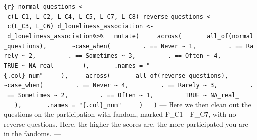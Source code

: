 \documentclass[
]{article}
\begin{document}
\texttt{\{r\}\ normal\_questions\ \textless{}-\ c(\textquotesingle{}L\_C1\textquotesingle{},\ \textquotesingle{}L\_C2\textquotesingle{},\ \textquotesingle{}L\_C4\textquotesingle{},\ \textquotesingle{}L\_C5\textquotesingle{},\ \textquotesingle{}L\_C7\textquotesingle{},\ \textquotesingle{}L\_C8\textquotesingle{})\ reverse\_questions\ \textless{}-\ c(\textquotesingle{}L\_C3\textquotesingle{},\ \textquotesingle{}L\_C6\textquotesingle{})\ d\_loneliness\_association\ \textless{}-\ d\_loneliness\_association\%\textgreater{}\%\ \ \ mutate(\ \ \ \ \ across(\ \ \ \ \ \ \ all\_of(normal\_questions),\ \ \ \ \ \ \ \textasciitilde{}case\_when(\ \ \ \ \ \ \ \ \ .\ ==\ \textquotesingle{}Never\textquotesingle{}\ \textasciitilde{}\ 1,\ \ \ \ \ \ \ \ \ .\ ==\ \textquotesingle{}Rarely\textquotesingle{}\ \textasciitilde{}\ 2,\ \ \ \ \ \ \ \ \ .\ ==\ \textquotesingle{}Sometimes\textquotesingle{}\ \textasciitilde{}\ 3,\ \ \ \ \ \ \ \ \ .\ ==\ \textquotesingle{}Often\textquotesingle{}\ \textasciitilde{}\ 4,\ \ \ \ \ \ \ \ \ TRUE\ \textasciitilde{}\ NA\_real\_\ \ \ \ \ \ \ ),\ \ \ \ \ \ \ .names\ =\ "\{.col\}\_num"\ \ \ \ \ ),\ \ \ \ \ across(\ \ \ \ \ \ \ all\_of(reverse\_questions),\ \ \ \ \ \ \ \textasciitilde{}case\_when(\ \ \ \ \ \ \ \ \ .\ ==\ \textquotesingle{}Never\textquotesingle{}\ \textasciitilde{}\ 4,\ \ \ \ \ \ \ \ \ .\ ==\ \textquotesingle{}Rarely\textquotesingle{}\ \textasciitilde{}\ 3,\ \ \ \ \ \ \ \ \ .\ ==\ \textquotesingle{}Sometimes\textquotesingle{}\ \textasciitilde{}\ 2,\ \ \ \ \ \ \ \ \ .\ ==\ \textquotesingle{}Often\textquotesingle{}\ \textasciitilde{}\ 1,\ \ \ \ \ \ \ \ \ TRUE\ \textasciitilde{}\ NA\_real\_\ \ \ \ \ \ \ ),\ \ \ \ \ \ \ .names\ =\ "\{.col\}\_num"\ \ \ \ \ )\ \ \ )}
--- Here we then clean out the questions on the participation with
fandom, marked F\_C1 - F\_C7, with no reverse questions. Here, the
higher the scores are, the more participated you are in the fandoms. ---
\end{document}
